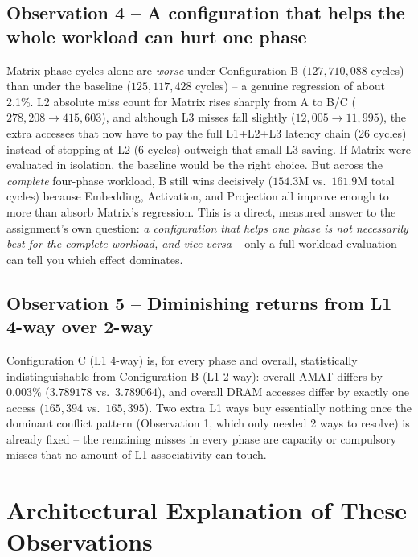 \documentclass[11pt]{article}
\begin{document}
\subsection{Observation 4 -- A configuration that helps the whole workload can hurt one phase}

Matrix-phase cycles alone are \emph{worse} under Configuration B
($127{,}710{,}088$ cycles) than under the baseline
($125{,}117{,}428$ cycles) -- a genuine regression of about 2.1\%. L2
absolute miss count for Matrix rises sharply from A to B/C
($278{,}208 \to 415{,}603$), and although L3 misses fall slightly
($12{,}005\to11{,}995$), the extra accesses that now have to pay the full
L1+L2+L3 latency chain (26 cycles) instead of stopping at L2 (6 cycles)
outweigh that small L3 saving. If Matrix were evaluated in isolation, the
baseline would be the right choice. But across the \emph{complete}
four-phase workload, B still wins decisively ($154.3$M vs.\ $161.9$M total
cycles) because Embedding, Activation, and Projection all improve enough
to more than absorb Matrix's regression. This is a direct, measured
answer to the assignment's own question: \emph{a configuration that helps
one phase is not necessarily best for the complete workload, and vice
versa} -- only a full-workload evaluation can tell you which effect
dominates.

\subsection{Observation 5 -- Diminishing returns from L1 4-way over 2-way}

Configuration C (L1 4-way) is, for every phase and overall, statistically
indistinguishable from Configuration B (L1 2-way): overall AMAT differs by
$0.003\%$ ($3.789178$ vs.\ $3.789064$), and overall DRAM accesses differ by
exactly one access ($165{,}394$ vs.\ $165{,}395$). Two extra L1 ways buy
essentially nothing once the dominant conflict pattern (Observation 1,
which only needed 2 ways to resolve) is already fixed -- the remaining
misses in every phase are capacity or compulsory misses that no amount of
L1 associativity can touch.

\section{Architectural Explanation of These Observations}
\end{document}
